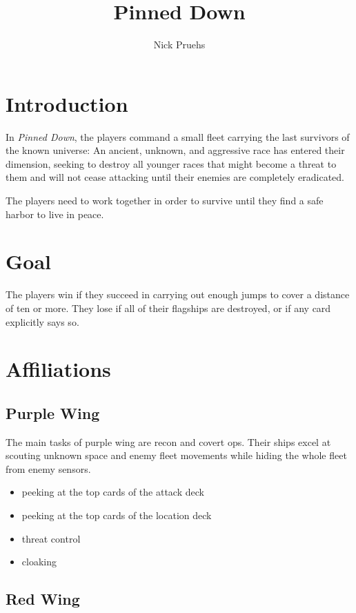\documentclass[11pt, a4paper]{article}
\title{Pinned Down}
\author{Nick Pruehs}
\begin{document}
\maketitle

\onehalfspacing

\tableofcontents

\section{Introduction}

In \emph{Pinned Down}, the players command a small fleet carrying the last
survivors of the known universe: An ancient, unknown, and aggressive race has
entered their dimension, seeking to destroy all younger races that might become
a threat to them and will not cease attacking until their enemies are completely
eradicated.

The players need to work together in order to survive until they find a safe
harbor to live in peace.

\section{Goal}

The players win if they succeed in carrying out enough jumps to cover a distance
of ten or more. They lose if all of their flagships are destroyed, or if any
card explicitly says so.

\section{Affiliations}
\subsection{Purple Wing}

The main tasks of purple wing are recon and covert ops. Their ships excel at
scouting unknown space and enemy fleet movements while hiding the whole fleet
from enemy sensors.

\begin{itemize}
 \item peeking at the top cards of the attack deck
 \item peeking at the top cards of the location deck
 \item threat control
 \item cloaking
\end{itemize}

\subsection{Red Wing}
\end{document}
